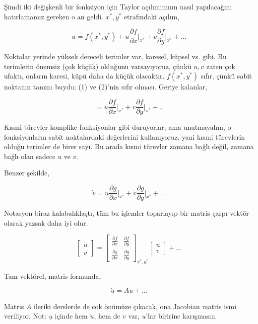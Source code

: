 \documentclass[12pt,fleqn]{article}\usepackage{../../common}
\begin{document}
Şimdi iki değişkenli bir fonksiyon için Taylor açılımınının nasıl yapılacağını
hatırlamamız gereken o an geldi. $x^\ast,y^\ast$ etrafındaki açılım,

$$
\dot{u} = f(x^\ast,y^\ast) + u \frac{\partial f}{\partial x}\bigg|_{x^\ast} +
v \frac{\partial f}{\partial y}\bigg|_{x^\ast} + ...
$$ 

Noktalar yerinde yüksek dereceli terimler var, karesel, küpsel vs. gibi. Bu
terimlerin önemsiz (çok küçük) olduğunu varsayıyoruz, çünkü $u,v$ zaten çok
ufaktı, onların karesi, küpü daha da küçük olacaktır. $f(x^\ast,y^\ast)$ sıfır, çünkü
sabit noktanın tanımı buydu; (1) ve (2)'nin sıfır olması. Geriye kalanlar, 

$$
=u \frac{\partial f}{\partial x}\bigg|_{x^\ast} +
 v \frac{\partial f}{\partial y}\bigg|_{x^\ast} + ..
$$ 

Kısmi türevler komplike fonksiyonlar gibi duruyorlar, ama unutmayalım, o
fonksiyonların sabit noktalardaki değerlerini kullanıyoruz, yani kısmi
türevlerin olduğu terimler de birer sayı. Bu arada kısmi türevler zamana bağlı
değil, zamana bağlı olan sadece $u$ ve $v$.

Benzer şekilde,

$$
\dot{v} =
u \frac{\partial g}{\partial x}\bigg|_{x^\ast} +
v \frac{\partial g}{\partial y}\bigg|_{x^\ast} + ...
$$ 

Notasyon biraz kalabalıklaştı, tüm bu işlemler toparlayıp bir matris çarpı
vektör olarak yazsak daha iyi olur.

$$
\left[\begin{array}{r}
\dot{u} \\ \dot{v}
\end{array}\right]
=
\left[\begin{array}{rr}
\frac{\partial f}{\partial x} & \frac{\partial f}{\partial y} \\
\frac{\partial g}{\partial x} & \frac{\partial g}{\partial y} 
\end{array}\right]_{x^\ast,y^\ast}
\left[\begin{array}{r} u \\ v \end{array}\right]
+ ...
$$

Tam vektörel, matris formunda,

$$ \dot{\underline{u}} = A \underline{u} + ...$$


Matris $A$ ileriki derslerde de cok önümüze çıkacak, ona Jacobian matris ismi
veriliyor.  Not: $\underline{u}$ içinde hem $\dot{u}$, hem de $\dot{v}$ var,
$u$'lar biririne karışmasın.
\end{document}
